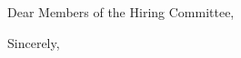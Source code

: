 \documentclass[11pt,a4paper,roman]{moderncv}
\begin{document}
\date{\today}
\opening{Dear Members of the Hiring Committee,}
\makelettertitle

\begin{justify}



\end{justify}

\vspace{0.3cm}
{Sincerely,\\
[Your Full Name, Degree]\\
[Your Current Title]\\
[Your Current Institution]}
\end{document}
